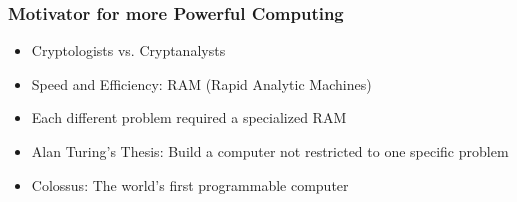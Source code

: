 \documentclass[12pt]{beamer}
\begin{document}
\begin{frame}
\begin{columns}
\begin{column}{0.5\textwidth}
\begin{center}
\end{center}
\end{column}
\end{columns}
\end{frame}

\begin{frame}
\frametitle{Motivator for more Powerful Computing}
\begin{itemize}
\item<2-> Cryptologists vs. Cryptanalysts
\item<3-> Speed and Efficiency: RAM (Rapid Analytic Machines)
\item<4-> Each different problem required a specialized RAM
\item<5-> Alan Turing's Thesis: Build a computer not restricted to one specific problem
\item<6-> Colossus: The world's first programmable computer
\end{itemize}
\begin{center}
\end{center}
\end{frame}
\end{document}
